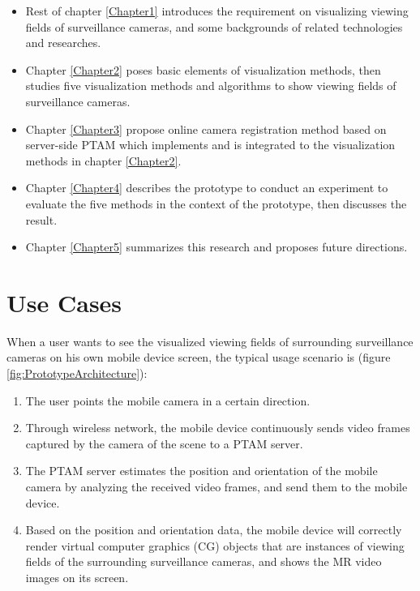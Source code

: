 \begin{itemize}
	\item Rest of chapter \ref{Chapter1} introduces the requirement on visualizing viewing fields of surveillance cameras, and some backgrounds of related technologies and researches.
	\item Chapter \ref{Chapter2} poses basic elements of visualization methods, then studies five visualization methods and algorithms to show viewing fields of surveillance cameras.
	\item Chapter \ref{Chapter3} propose online camera registration method based on server-side PTAM which implements and is integrated to the visualization methods in chapter \ref{Chapter2}.
	\item Chapter \ref{Chapter4} describes the prototype to conduct an experiment to evaluate the five methods in the context of the prototype, then discusses the result.
	\item Chapter \ref{Chapter5} summarizes this research and proposes future directions.
\end{itemize}


\section{Use Cases}
\label{UseCases}

When a user wants to see the visualized viewing fields of surrounding surveillance cameras on his own mobile device screen, the typical usage scenario is (figure \ref{fig:PrototypeArchitecture}):

\begin{enumerate}
	\item The user points the mobile camera in a certain direction.
	\item Through wireless network, the mobile device continuously sends video frames captured by the camera of the scene to a PTAM server.
	\item The PTAM server estimates the position and orientation of the mobile camera by analyzing the received video frames, and send them to the mobile device.
	\item Based on the position and orientation data, the mobile device will correctly render virtual computer graphics (CG) objects that are instances of viewing fields of the surrounding surveillance cameras, and shows the MR video images on its screen.
\end{enumerate}

